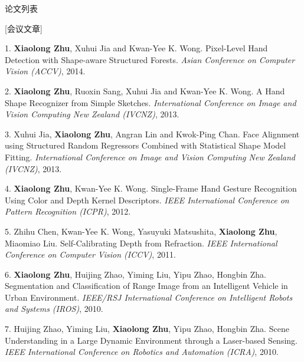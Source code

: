 \documentclass{cv_professional-cn} %
\makeatletter
\newlength{\bibhang}
\newlength{\bibsep}
 {\@listi \global\bibsep\itemsep \global\advance\bibsep by\parsep}
\newenvironment{bibsection}%
        {\vspace{\itemsep}\begin{list}{}{%
       \setlength{\leftmargin}{\bibhang}%
       \setlength{\itemsep}{\bibsep}%
       \setlength{\parsep}{\z@}%
        \setlength{\partopsep}{0pt}%
        \setlength{\topsep}{0pt}}}
        {\end{list}\vspace{\itemsep}}
\makeatother
\begin{document}

\begin{rSection}{论文列表}

[会议文章]

\begin{bibsection}
	\item[1.] \textbf{Xiaolong Zhu}, Xuhui Jia and Kwan-Yee K. Wong. Pixel-Level Hand Detection with Shape-aware Structured Forests. \emph{Asian Conference on Computer Vision (ACCV)}, 2014.
	
	\item[2.] \textbf{Xiaolong Zhu}, Ruoxin Sang, Xuhui Jia and Kwan-Yee K. Wong. A Hand Shape Recognizer from Simple Sketches. \emph{International Conference on Image and Vision Computing New Zealand (IVCNZ)}, 2013.
	
	\item[3.] Xuhui Jia, \textbf{Xiaolong Zhu}, Angran Lin and Kwok-Ping Chan. Face Alignment using Structured Random Regressors Combined with Statistical Shape Model Fitting. \emph{International Conference on Image and Vision Computing New Zealand (IVCNZ)}, 2013.
	
	\item[4.] \textbf{Xiaolong Zhu}, Kwan-Yee K. Wong. Single-Frame Hand Gesture Recognition Using Color and Depth Kernel Descriptors. \emph{IEEE International Conference on Pattern Recognition (ICPR)}, 2012.
	
	\item[5.] Zhihu Chen, Kwan-Yee K. Wong, Yasuyuki Matsushita, \textbf{Xiaolong Zhu}, Miaomiao Liu. Self-Calibrating Depth from Refraction. \emph{IEEE International Conference on Computer Vision (ICCV)}, 2011.
	
	\item[6.] \textbf{Xiaolong Zhu}, Huijing Zhao, Yiming Liu, Yipu Zhao, Hongbin Zha. Segmentation and Classification of Range Image from an Intelligent Vehicle in Urban Environment. \emph{IEEE/RSJ International Conference on Intelligent Robots and Systems (IROS)}, 2010.
	
	\item[7.] Huijing Zhao, Yiming Liu,\textbf{ Xiaolong Zhu}, Yipu Zhao, Hongbin Zha. Scene Understanding in a Large Dynamic Environment through a Laser-based Sensing. \emph{IEEE International Conference on Robotics and Automation (ICRA)}, 2010.
\end{bibsection}


\end{rSection}
\end{document}
